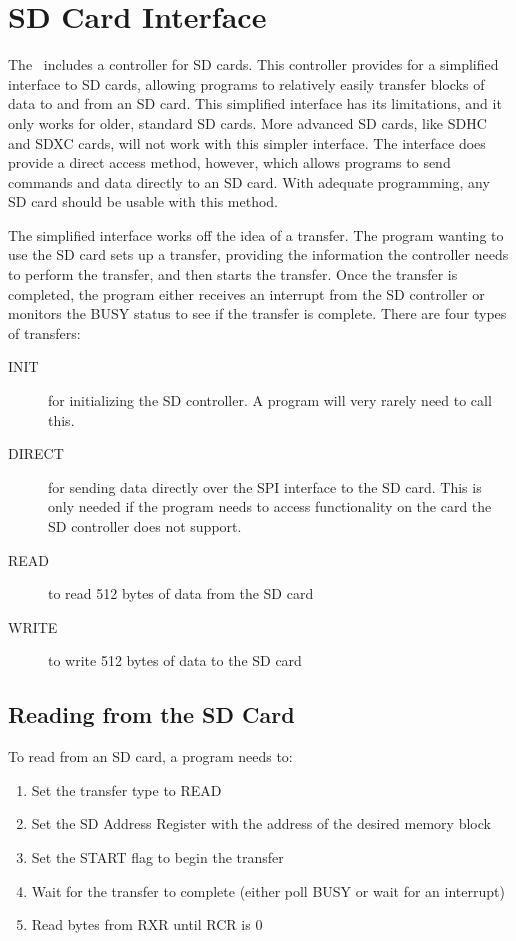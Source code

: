 \chapter{SD Card Interface}

The \jr\ includes a controller for SD cards. This controller provides for a simplified interface to SD cards, allowing programs to relatively easily transfer blocks of data to and from an SD card. This simplified interface has its limitations, and it only works for older, standard SD cards. More advanced SD cards, like SDHC and SDXC cards, will not work with this simpler interface. The interface does provide a direct access method, however, which allows programs to send commands and data directly to an SD card. With adequate programming, any SD card should be usable with this method.

The simplified interface works off the idea of a transfer. The program wanting to use the SD card sets up a transfer, providing the information the controller needs to perform the transfer, and then starts the transfer. Once the transfer is completed, the program either receives an interrupt from the SD controller or monitors the BUSY status to see if the transfer is complete. There are four types of transfers:

\begin{description}
    \item[INIT] for initializing the SD controller. A program will very rarely need to call this.

    \item[DIRECT] for sending data directly over the SPI interface to the SD card. This is only needed if the program needs to access functionality on the card the SD controller does not support.

    \item[READ] to read 512 bytes of data from the SD card

    \item[WRITE] to write 512 bytes of data to the SD card
\end{description}

\section*{Reading from the SD Card}
To read from an SD card, a program needs to:
\begin{enumerate}
    \item Set the transfer type to READ
    \item Set the SD Address Register with the address of the desired memory block
    \item Set the START flag to begin the transfer
    \item Wait for the transfer to complete (either poll BUSY or wait for an interrupt)
    \item Read bytes from RXR until RCR is 0
\end{enumerate}

